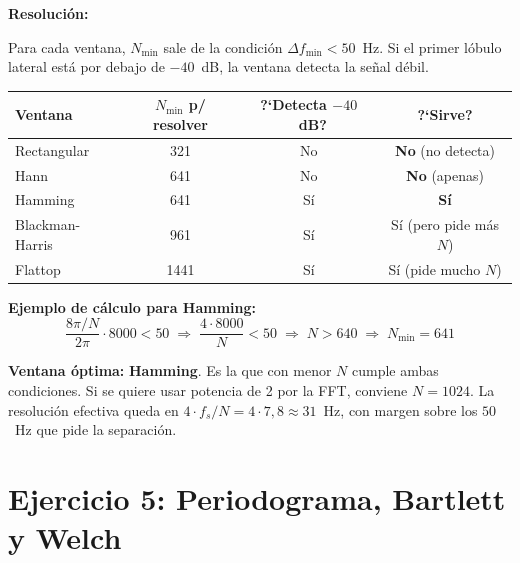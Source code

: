 \documentclass[11pt, a4paper]{article}
\newcommand{\res}{\smallskip\noindent\textbf{\color{enunline}Resoluci\'on:}\smallskip}
\begin{document}
\res

Para cada ventana, $N_{\min}$ sale de la condici\'on
$\Delta f_{\min} < 50$~Hz.
Si el primer l\'obulo lateral est\'a por debajo de $-40$~dB,
la ventana detecta la se\~nal d\'ebil.

\begin{center}
\begin{tabular}{lccc}
\toprule
Ventana & $N_{\min}$ p/ resolver & ?`Detecta $-40$~dB? & ?`Sirve? \\
\midrule
Rectangular     & 321  & No  & \textbf{No} (no detecta) \\
Hann            & 641  & No  & \textbf{No} (apenas) \\
Hamming         & 641  & S\'i & \textbf{S\'i} \\
Blackman-Harris & 961  & S\'i & S\'i (pero pide m\'as $N$) \\
Flattop         & 1441 & S\'i & S\'i (pide mucho $N$) \\
\bottomrule
\end{tabular}
\end{center}

\textbf{Ejemplo de c\'alculo para Hamming:}
\[
  \frac{8\pi/N}{2\pi}\cdot 8000 < 50
  \;\Rightarrow\; \frac{4 \cdot 8000}{N} < 50
  \;\Rightarrow\; N > 640
  \;\Rightarrow\; N_{\min} = 641
\]

\textbf{Ventana \'optima:} \textbf{Hamming}.
Es la que con menor $N$ cumple ambas condiciones.
Si se quiere usar potencia de 2 por la FFT, conviene $N = 1024$.
La resoluci\'on efectiva queda en $4 \cdot f_s/N = 4 \cdot 7{,}8 \approx 31$~Hz,
con margen sobre los $50$~Hz que pide la separaci\'on.

\section*{Ejercicio 5: Periodograma, Bartlett y Welch}
\end{document}
